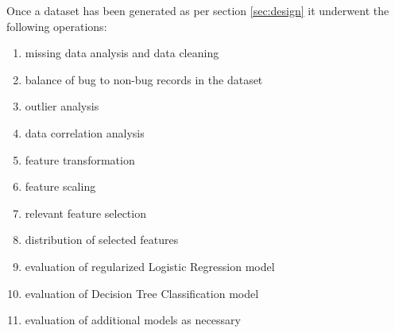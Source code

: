 Once a dataset has been generated as per section \ref{sec:design} it underwent the following operations:
\begin{enumerate}\label{lst:dataset-ops}
    \item missing data analysis and data cleaning \label{lst:dataset-ops.item:data-cleaning}
    \item balance of bug to non-bug records in the dataset \label{lst:dataset-ops.item:bug-to-non-bug-balance}
    \item outlier analysis \label{lst:dataset-ops.item:outliers}
    \item data correlation analysis \label{lst:dataset-ops.item:data-correlation}
    \item feature transformation \label{lst:dataset-ops.item:feature-transformation}
    \item feature scaling \label{lst:dataset-ops.item:data-scaling}
    \item relevant feature selection \label{lst:dataset-ops.item:feature-selection}
    \item distribution of selected features \label{lst:dataset-ops.item:attribute-distribution}
    \item evaluation of regularized Logistic Regression model \label{lst:dataset-ops.item:ml-logistic-regression}
    \item evaluation of Decision Tree Classification model \label{lst:dataset-ops.item:ml-decision-tree}
    \item evaluation of additional models as necessary \label{lst:dataset-ops.item:ml-models-additional}
\end{enumerate}

